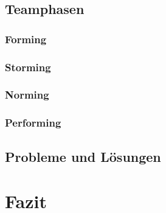 \documentclass[a4paper,12pt,headsepline,toc=flat]{scrartcl}
\begin{document}
	\subsection{Teamphasen}
	\subsubsection{Forming}
	\subsubsection{Storming}
	\subsubsection{Norming}
	\subsubsection{Performing}
	\subsection{Probleme und Lösungen}
	\section{Fazit}
\end{document}

